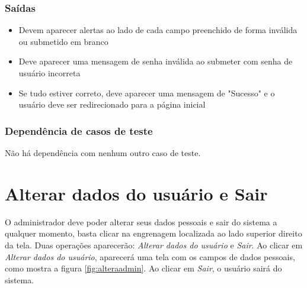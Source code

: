 \subsubsection{Saídas}

\begin{itemize}

	\item Devem aparecer alertas ao lado de cada campo preenchido de forma inválida ou submetido em branco
	\item Deve aparecer uma mensagem de senha inválida ao submeter com senha de usuário incorreta
	\item Se tudo estiver correto, deve aparecer uma mensagem de "Sucesso" e o usuário deve ser redirecionado para a página inicial
	
\end{itemize}

\subsubsection{Dependência de casos de teste}
Não há dependência com nenhum outro caso de teste.

\section{Alterar dados do usuário e Sair}

O administrador deve poder alterar seus dados pessoais e sair do sistema a qualquer momento, basta clicar na engrenagem localizada ao lado superior direito da tela. Duas operações aparecerão: \textit{Alterar dados do usuário} e \textit{Sair}. Ao clicar em \textit{Alterar dados do usuário}, aparecerá uma tela com os campos de dados pessoais, como mostra a figura \ref{fig:alteraadmin}. Ao clicar em \textit{Sair}, o usuário sairá do sistema.

